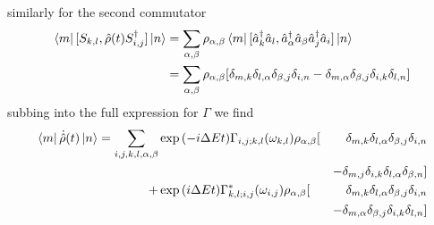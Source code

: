 similarly for the second commutator
\begin{align}
  \bra{m}[S_{k, l},
  \hat{\rho}(t)S^\dagger_{i, j}] \ket{n} & =
  \sum_{\alpha, \beta} \rho_{\alpha, \beta}\bra{m}
  [\hat{a}^\dagger_k \hat{a}_l
    ,\hat{a}^\dagger_\alpha \hat{a}_\beta
    \hat{a}^\dagger_j \hat{a}_i]
  \ket{n}                                    \\
                                         & =
  \sum_{\alpha, \beta} \rho_{\alpha, \beta} [
    \delta_{m, k}\delta_{l, \alpha}
    \delta_{\beta, j}\delta_{i, n}
    -\delta_{m, \alpha}\delta_{\beta, j}
    \delta_{i, k}\delta_{l, n}]
\end{align}
subbing into the full expression for
\(\Gamma \) we find
\begin{align}
  \bra{m}\dot{\hat{\rho}}(t) \ket{n} = \begin{aligned}[t]
    \sum_{i,j,k, l, \alpha, \beta} &
    \exp{(-i\Delta{}Et)}
    \Gamma_{i,j;k, l}(\omega_{k,l})
    \rho_{\alpha, \beta} [         &
      \delta_{m, k}\delta_{l, \alpha}
    \delta_{\beta, j}\delta_{i, n}                          \\
                                   &                      &
      -\delta_{m, j}\delta_{i, k}
    \delta_{l, \alpha}\delta_{\beta, n}]                    \\
    +                              & \exp{(i\Delta{}E t)}
    \Gamma^*_{k, l; i,j}(\omega_{i,j})
    \rho_{\alpha, \beta} [         &
      \delta_{m, k}\delta_{l, \alpha}
    \delta_{\beta, j}\delta_{i, n}                          \\
                                   &                      &
      - \delta_{m, \alpha}\delta_{\beta, j}
      \delta_{i, k}\delta_{l, n}]
  \end{aligned}
\end{align}

